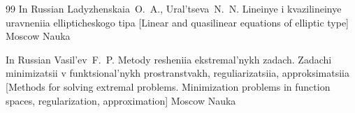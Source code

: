 \begin{thebibliography}{99}
\lang In Russian
\by Ladyzhenskaia~O.~A., Ural'tseva~N.~N.
\book Lineinye i kvazilineinye uravneniia ellipticheskogo tipa \rm [Linear and quasilinear equations of elliptic type]
\publaddr Moscow
\publ Nauka


\lang In Russian
\by Vasil'ev~F.~P.
\book Metody resheniia ekstremal'nykh zadach. Zadachi minimizatsii v funktsional'nykh prostranstvakh, reguliarizatsiia, approksimatsiia \rm [Methods for solving extremal problems. Minimization 
problems in function spaces, regularization, approximation]
\publaddr Moscow
\publ Nauka

\end{thebibliography}


\renewcommand{\baselinestretch}{0.9}

%


